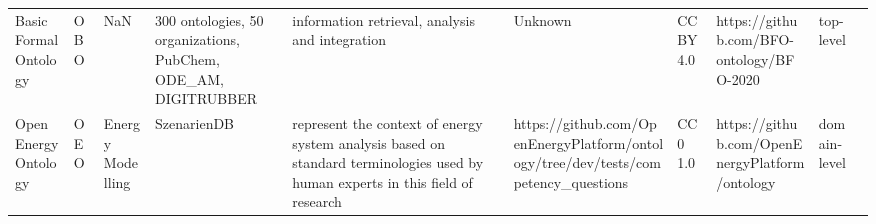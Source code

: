 \begin{tabular}{llllllllll}
                                                            Basic Formal Ontology &                     OBO &                                         NaN &                                                                                                                                                                                                                                                                                                       300 ontologies, 50 organizations, PubChem, ODE_AM, DIGITRUBBER &                                                                                                                                                                                                                                                                                                                                                        information retrieval, analysis and integration &                                                                                                            Unknown &                                    CC BY 4.0 &                                                          https://github.com/BFO-ontology/BFO-2020  &         top-level \\
                                                             Open Energy Ontology &                     OEO &                            Energy Modelling &                                                                                                                                                                                                                                                                                                                                                          SzenarienDB &                                                                                                                                                                                                                                                                        represent the context of energy system analysis based on standard terminologies used by human experts in this field of research &                                 https://github.com/OpenEnergyPlatform/ontology/tree/dev/tests/competency_questions &                                      CC0 1.0 &                                                     https://github.com/OpenEnergyPlatform/ontology &      domain-level \\

\end{tabular}

